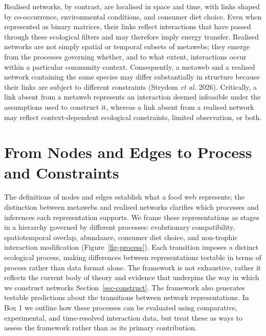 \documentclass[
]{article}
\begin{document}
Realised networks, by contrast, are localised in space and time, with
links shaped by co-occurrence, environmental conditions, and consumer
diet choice. Even when represented as binary matrices, their links
reflect interactions that have passed through these ecological filters
and may therefore imply energy transfer. Realised networks are not
simply spatial or temporal subsets of metawebs; they emerge from the
processes governing whether, and to what extent, interactions occur
within a particular community context. Consequently, a metaweb and a
realised network containing the same species may differ substantially in
structure because their links are subject to different constraints
(Strydom \emph{et al.} 2026). Critically, a link absent from a metaweb
represents an interaction deemed infeasible under the assumptions used
to construct it, whereas a link absent from a realised network may
reflect context-dependent ecological constraints, limited observation,
or both.

\section{From Nodes and Edges to Process and
Constraints}\label{sec-process}

The definitions of nodes and edges establish what a food web represents;
the distinction between metawebs and realised networks clarifies which
processes and inferences each representation supports. We frame these
representations as stages in a hierarchy governed by different
processes: evolutionary compatibility, spatiotemporal overlap,
abundance, consumer diet choice, and non-trophic interaction
modification (Figure~\ref{fig-process}). Each transition imposes a
distinct ecological process, making differences between representations
testable in terms of process rather than data format alone. The
framework is not exhaustive, rather it reflects the current body of
theory and evidence that underpins the way in which we construct
networks Section~\ref{sec-construct}. The framework also generates
testable predictions about the transitions between network
representations. In Box 1 we outline how these processes can be
evaluated using comparative, experimental, and time-resolved interaction
data, but treat these as ways to assess the framework rather than as its
primary contribution.
\end{document}
